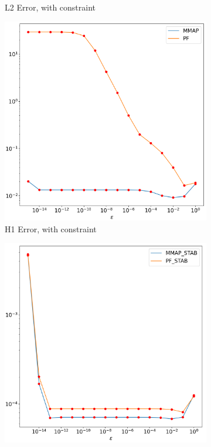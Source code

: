 \documentclass[12pt]{ociamthesis}
\begin{document}
\begin{figure}[H]
\begin{subfigure}{0.44\textwidth}
     \caption{L2 Error, with constraint}
 \end{subfigure}
 \begin{subfigure}{0.44\textwidth}
     \includegraphics[width=\textwidth]{Pics/LHSims/E2/E2_INH1.png}
     \caption{H1 Error, with constraint}
 \end{subfigure}
 \begin{subfigure}{0.44\textwidth}
     \includegraphics[width=\textwidth]{Pics/LHSims/E2/E2_STABL2.png}

\end{subfigure}
\end{figure}
\end{document}
